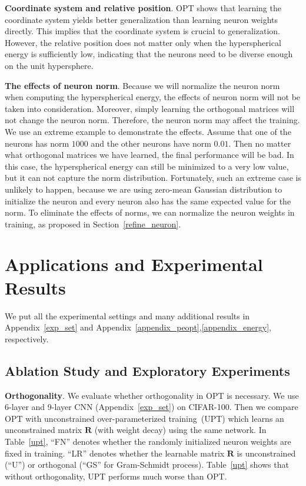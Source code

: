 \textbf{Coordinate system and relative position}. OPT shows that learning the coordinate system yields better generalization than learning neuron weights directly. This implies that the coordinate system is crucial to generalization. However, the relative position does not matter only when the hyperspherical energy is sufficiently low, indicating that the neurons need to be diverse enough on the unit hypersphere.

\textbf{The effects of neuron norm}. Because we will normalize the neuron norm when computing the hyperspherical energy, the effects of neuron norm will not be taken into consideration. Moreover, simply learning the orthogonal matrices will not change the neuron norm. Therefore, the neuron norm may affect the training. We use an extreme example to demonstrate the effects. Assume that one of the neurons has norm $1000$ and the other neurons have norm $0.01$. Then no matter what orthogonal matrices we have learned, the final performance will be bad. In this case, the hyperspherical energy can still be minimized to a very low value, but it can not capture the norm distribution. Fortunately, such an extreme case is unlikely to happen, because we are using zero-mean Gaussian distribution to initialize the neuron and every neuron also has the same expected value for the norm. To eliminate the effects of norms, we can normalize the neuron weights in training, as proposed in Section~\ref{refine_neuron}.

\section{Applications and Experimental Results}\label{exp_results}

We put all the experimental settings and many additional results in Appendix~\ref{exp_set} and Appendix~\ref{appendix_peopt},\ref{appendix_energy}, respectively.

\subsection{Ablation Study and Exploratory Experiments}

\textbf{Orthogonality}. We evaluate whether orthogonality in OPT is necessary. We use 6-layer and 9-layer CNN (Appendix~\ref{exp_set}) on CIFAR-100. Then we compare OPT with unconstrained over-parameterized training~(UPT) which learns an unconstrained matrix $\bm{R}$ (with weight decay) using the same network. In Table~\ref{upt}, ``FN'' denotes whether the randomly initialized neuron weights are fixed in training. ``LR'' denotes whether the learnable matrix $\bm{R}$ is unconstrained (``U'') or orthogonal (``GS'' for Gram-Schmidt process). Table~\ref{upt} shows that without orthogonality, UPT performs much worse than OPT. 

